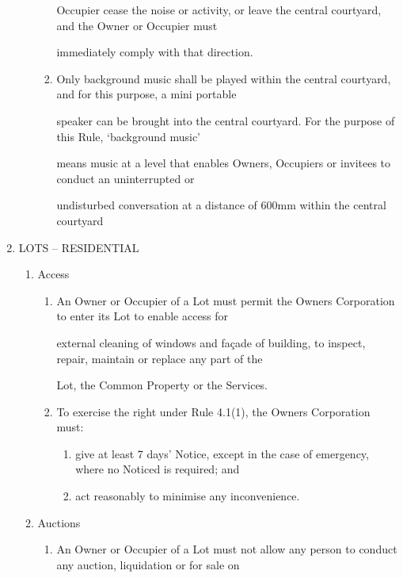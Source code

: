 \documentclass{article}
\begin{document}
\begin{enumerate}[label=\arabic*.]
\begin{enumerate}[label=\arabic{enumi}.\arabic*.]
\begin{enumerate}[label=(\arabic*)]
Occupier cease the noise or activity, or leave the central courtyard, and the Owner or Occupier must 

immediately comply with that direction. 

\item  Only background music shall be played within the central courtyard, and for this purpose, a mini portable 

speaker can be brought into the central courtyard. For the purpose of this Rule, ‘background music’ 

means music at a level that enables Owners, Occupiers or invitees to conduct an uninterrupted or 

undisturbed conversation at a distance of 600mm within the central courtyard  

\end{enumerate}
\end{enumerate}
\item  LOTS – RESIDENTIAL 

\begin{enumerate}[label=\arabic{enumi}.\arabic*.]
\item  Access 

\begin{enumerate}[label=(\arabic*)]
\item  An Owner or Occupier of a Lot must permit the Owners Corporation to enter its Lot to enable access for 

external cleaning of windows and façade of building, to inspect, repair, maintain or replace any part of the 

Lot, the Common Property or the Services. 

\item  To exercise the right under Rule 4.1(1), the Owners Corporation must: 

\begin{enumerate}[label=(\alph*)]
\item  give at least 7 days’ Notice, except in the case of emergency, where no Noticed is required; and 

\item  act reasonably to minimise any inconvenience. 

\end{enumerate}
\end{enumerate}
\item  Auctions 

\begin{enumerate}[label=(\arabic*)]
\item  An Owner or Occupier of a Lot must not allow any person to conduct any auction, liquidation or for sale on 


\end{enumerate}
\end{enumerate}
\end{enumerate}
\end{document}
